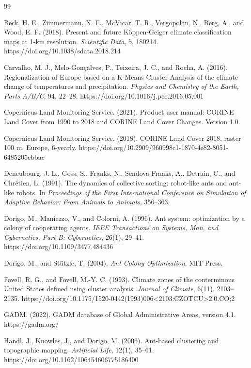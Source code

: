 \documentclass[11pt]{article}
\begin{document}
\begin{thebibliography}{99}

Beck, H. E., Zimmermann, N. E., McVicar, T. R., Vergopolan, N., Berg, A., and Wood, E. F. (2018).
Present and future Köppen-Geiger climate classification maps at 1-km resolution.
\textit{Scientific Data}, 5, 180214.
https://doi.org/10.1038/sdata.2018.214

Carvalho, M. J., Melo-Gonçalves, P., Teixeira, J. C., and Rocha, A. (2016).
Regionalization of Europe based on a K-Means Cluster Analysis of the climate change of temperatures and precipitation.
\textit{Physics and Chemistry of the Earth, Parts A/B/C}, 94, 22--28.
https://doi.org/10.1016/j.pce.2016.05.001

Copernicus Land Monitoring Service. (2021).
Product user manual: CORINE Land Cover from 1990 to 2018 and CORINE Land Cover Changes.
Version 1.0.

Copernicus Land Monitoring Service. (2018).
CORINE Land Cover 2018, raster 100 m, Europe, 6-yearly.
https://doi.org/10.2909/960998c1-1870-4e82-8051-6485205ebbac

Deneubourg, J.-L., Goss, S., Franks, N., Sendova-Franks, A., Detrain, C., and Chrétien, L. (1991).
The dynamics of collective sorting: robot-like ants and ant-like robots.
In \textit{Proceedings of the First International Conference on Simulation of Adaptive Behavior: From Animals to Animats}, 356--363.

Dorigo, M., Maniezzo, V., and Colorni, A. (1996).
Ant system: optimization by a colony of cooperating agents.
\textit{IEEE Transactions on Systems, Man, and Cybernetics, Part B: Cybernetics}, 26(1), 29--41.
https://doi.org/10.1109/3477.484436

Dorigo, M., and Stützle, T. (2004).
\textit{Ant Colony Optimization}.
MIT Press.

Fovell, R. G., and Fovell, M.-Y. C. (1993).
Climate zones of the conterminous United States defined using cluster analysis.
\textit{Journal of Climate}, 6(11), 2103--2135.
https://doi.org/10.1175/1520-0442(1993)006<2103:CZOTCU>2.0.CO;2

GADM. (2022).
GADM database of Global Administrative Areas, version 4.1.
https://gadm.org/

Handl, J., Knowles, J., and Dorigo, M. (2006).
Ant-based clustering and topographic mapping.
\textit{Artificial Life}, 12(1), 35--61.
https://doi.org/10.1162/106454606775186400


\end{thebibliography}
\end{document}

